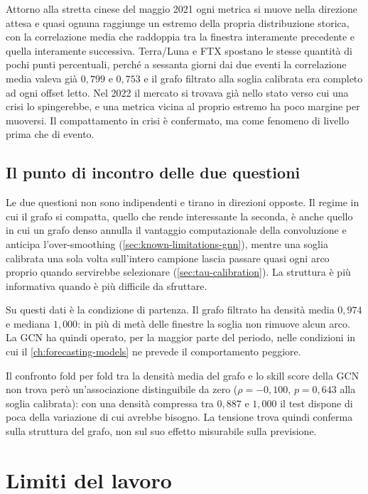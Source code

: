 Attorno alla stretta cinese del maggio 2021 ogni metrica si muove nella direzione attesa e quasi ognuna raggiunge un estremo della propria distribuzione storica, con la correlazione media che raddoppia tra la finestra interamente precedente e quella interamente successiva. Terra/Luna e FTX spostano le stesse quantità di pochi punti percentuali, perché a sessanta giorni dai due eventi la correlazione media valeva già $0{,}799$ e $0{,}753$ e il grafo filtrato alla soglia calibrata era completo ad ogni offset letto. Nel 2022 il mercato si trovava già nello stato verso cui una crisi lo spingerebbe, e una metrica vicina al proprio estremo ha poco margine per muoversi. Il compattamento in crisi è confermato, ma come fenomeno di livello prima che di evento.

\subsection{Il punto di incontro delle due questioni}

Le due questioni non sono indipendenti e tirano in direzioni opposte. Il regime in cui il grafo si compatta, quello che rende interessante la seconda, è anche quello in cui un grafo denso annulla il vantaggio computazionale della convoluzione e anticipa l'over-smoothing (\cref{sec:known-limitations-gnn}), mentre una soglia calibrata una sola volta sull'intero campione lascia passare quasi ogni arco proprio quando servirebbe selezionare (\cref{sec:tau-calibration}). La struttura è più informativa quando è più difficile da sfruttare.

Su questi dati è la condizione di partenza. Il grafo filtrato ha densità media $0{,}974$ e mediana $1{,}000$: in più di metà delle finestre la soglia non rimuove alcun arco. La GCN ha quindi operato, per la maggior parte del periodo, nelle condizioni in cui il \cref{ch:forecasting-models} ne prevede il comportamento peggiore.

Il confronto fold per fold tra la densità media del grafo e lo skill score della GCN non trova però un'associazione distinguibile da zero ($\rho=-0{,}100$, $p=0{,}643$ alla soglia calibrata): con una densità compressa tra $0{,}887$ e $1{,}000$ il test dispone di poca della variazione di cui avrebbe bisogno. La tensione trova quindi conferma sulla struttura del grafo, non sul suo effetto misurabile sulla previsione.

\section{Limiti del lavoro}
\label{sec:limitations}

